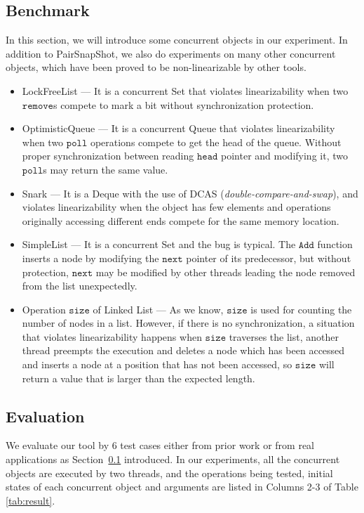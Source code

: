 \documentclass[runningheads]{llncs}
\begin{document}
\subsection{Benchmark}\label{sec:benchmarks}
In this section, we will introduce some concurrent objects in our experiment. 
In addition to PairSnapShot, we also do experiments on many other concurrent objects, which have been proved to be non-linearizable by other tools.

\begin{itemize}
  \item LockFreeList \cite{herlihy2012art} --- It is a concurrent Set that violates linearizability when two $\mathtt{remove}$s compete to mark a bit without synchronization protection.
  \item OptimisticQueue \cite{DBLP:conf/wdag/Ladan-MozesS04} --- It is a concurrent Queue that violates linearizability when two $\mathtt{poll}$ operations compete to get the head of the queue. Without proper synchronization between reading $\mathtt{head}$ pointer and modifying it, two $\mathtt{poll}$s may return the same value.

  \item Snark \cite{DBLP:conf/spaa/DohertyDGFLMMSS04} --- It is a Deque with the use of DCAS (\textit{double-compare-and-swap}), and violates linearizability when the object has few elements and operations originally accessing different ends compete for the same memory location.

  \item SimpleList \cite{DBLP:conf/pldi/VechevY08} --- It is a concurrent Set and the bug is typical. The $\mathtt{Add}$ function inserts a node by modifying the $\mathtt{next}$ pointer of its predecessor, but without protection, $\mathtt{next}$ may be modified by other threads leading the node removed from the list unexpectedly.
  \item Operation $\mathtt{size}$ of Linked List --- As we know, $\mathtt{size}$ is used for counting the number of nodes in a list. However, if there is no synchronization, a situation that violates linearizability happens when $\mathtt{size}$ traverses the list, another thread preempts the execution and deletes a node which has been accessed and inserts a node at a position that has not been accessed, so $\mathtt{size}$ will return a value that is larger than the expected length.
\end{itemize}



\subsection{Evaluation}
We evaluate our tool by 6 test cases either from prior work or from real applications as Section~\ref{sec:benchmarks} introduced.
In our experiments, all the concurrent objects are executed by two threads, and the operations being tested, initial states of 
each concurrent object and arguments are listed in Columns 2-3 of Table \ref{tab:result}. 
\end{document}
